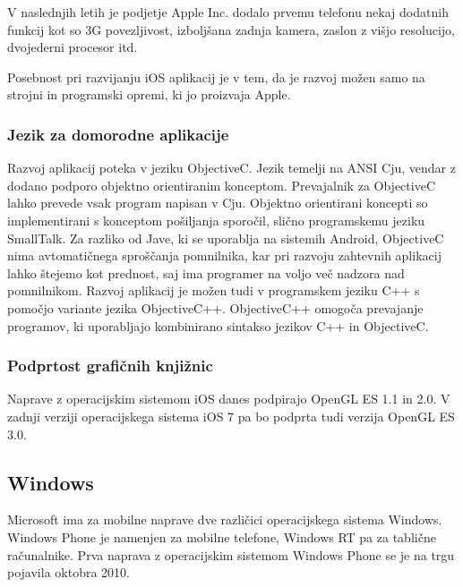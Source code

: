 V naslednjih letih je podjetje Apple Inc. dodalo prvemu telefonu nekaj dodatnih funkcij kot so 3G povezljivost, izboljšana zadnja kamera, zaslon z višjo resolucijo, dvojederni procesor itd.

Posebnost pri razvijanju iOS aplikacij je v tem, da je razvoj možen samo na strojni in programski opremi, ki jo proizvaja Apple.

\subsubsection{Jezik za domorodne aplikacije} 

Razvoj aplikacij poteka v jeziku ObjectiveC. Jezik temelji na ANSI Cju, vendar z dodano podporo objektno orientiranim konceptom. Prevajalnik za ObjectiveC lahko prevede vsak program napisan v Cju. Objektno orientirani koncepti so implementirani s konceptom pošiljanja sporočil, slično programskemu jeziku SmallTalk. Za razliko od Jave, ki se uporablja na sistemih Android, ObjectiveC nima avtomatičnega sproščanja pomnilnika, kar pri razvoju zahtevnih aplikacij lahko štejemo kot prednost, saj ima programer na voljo več nadzora nad pomnilnikom. Razvoj aplikacij je možen tudi v programskem jeziku C++ s pomočjo variante jezika ObjectiveC++. ObjectiveC++ omogoča prevajanje programov, ki uporabljajo kombinirano sintakso jezikov C++ in ObjectiveC.

\subsubsection{Podprtost grafičnih knjižnic}

Naprave z operacijskim sistemom iOS danes podpirajo OpenGL ES 1.1 in 2.0. V zadnji verziji operacijskega sistema iOS 7 pa bo podprta tudi verzija OpenGL ES 3.0.

\subsection{Windows}

% 

Microsoft ima za mobilne naprave dve različici operacijskega sistema Windows. Windows Phone \cite{winphone} je namenjen za mobilne telefone, Windows RT pa za tablične računalnike. Prva naprava z operacijskim sistemom Windows Phone se je na trgu pojavila oktobra 2010.

